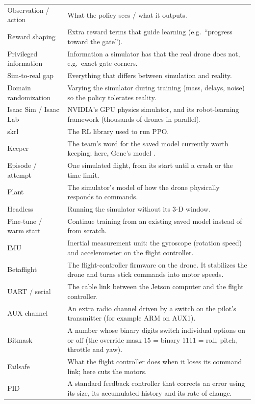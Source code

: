\documentclass[10pt,a4paper]{article}
\newcommand{\code}[1]{\texttt{\detokenize{#1}}}
\begin{document}
\begin{longtable}{@{}p{3.3cm}p{12.3cm}@{}}
Observation / action & What the policy sees / what it outputs. \\
Reward shaping & Extra reward terms that guide learning (e.g.\ ``progress toward the gate''). \\
Privileged information & Information a simulator has that the real drone does not, e.g.\ exact gate corners. \\
Sim-to-real gap & Everything that differs between simulation and reality. \\
Domain randomization & Varying the simulator during training (mass, delays, noise) so the policy tolerates reality. \\
Isaac Sim / Isaac Lab & NVIDIA's GPU physics simulator, and its robot-learning framework (thousands of drones in parallel). \\
skrl & The RL library used to run PPO. \\
Keeper & The team's word for the saved model currently worth keeping; here, Gene's model \code{pq_speed_best.pt}. \\
Episode / attempt & One simulated flight, from its start until a crash or the time limit. \\
Plant & The simulator's model of how the drone physically responds to commands. \\
Headless & Running the simulator without its 3-D window. \\
Fine-tune / warm start & Continue training from an existing saved model instead of from scratch. \\
IMU & Inertial measurement unit: the gyroscope (rotation speed) and accelerometer on the flight controller. \\
Betaflight & The flight-controller firmware on the drone. It stabilizes the drone and turns stick commands into motor speeds. \\
UART / serial & The cable link between the Jetson computer and the flight controller. \\
AUX channel & An extra radio channel driven by a switch on the pilot's transmitter (for example ARM on AUX1). \\
Bitmask & A number whose binary digits switch individual options on or off (the override mask 15 = binary 1111 = roll, pitch, throttle and yaw). \\
Failsafe & What the flight controller does when it loses its command link; here \code{DROP} cuts the motors. \\
PID & A standard feedback controller that corrects an error using its size, its accumulated history and its rate of change. \\

\end{longtable}
\end{document}
